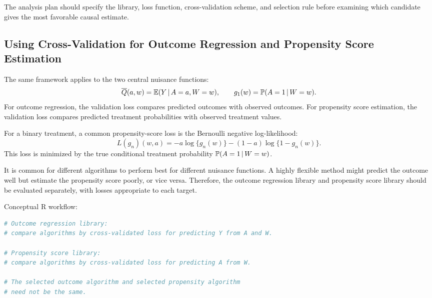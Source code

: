 \begin{keyidea}
The analysis plan should specify the library, loss function, cross-validation scheme,
and selection rule before examining which candidate gives the most favorable causal
estimate.
\end{keyidea}

\subsection{Using Cross-Validation for Outcome Regression and Propensity Score Estimation}

The same framework applies to the two central nuisance functions:
\[
\overline{Q}(a,w)=\mathbb{E}(Y\,\vert\, A=a,W=w),
\qquad
g_1(w)=\mathbb{P}(A=1\,\vert\, W=w).
\]
For outcome regression, the validation loss compares predicted outcomes with
observed outcomes. For propensity score estimation, the validation loss compares
predicted treatment probabilities with observed treatment values.

For a binary treatment, a common propensity-score loss is the Bernoulli negative
log-likelihood:
\[
L(g_n)(w,a)
=
-a\log\{g_n(w)\}-(1-a)\log\{1-g_n(w)\}.
\]
This loss is minimized by the true conditional treatment probability
$\mathbb{P}(A=1\,\vert\, W=w)$.

It is common for different algorithms to perform best for different nuisance
functions. A highly flexible method might predict the outcome well but estimate the
propensity score poorly, or vice versa. Therefore, the outcome regression library and
propensity score library should be evaluated separately, with losses appropriate to
each target.

\begin{implementationbox}
Conceptual R workflow:
\begin{lstlisting}[language=R]
# Outcome regression library:
# compare algorithms by cross-validated loss for predicting Y from A and W.

# Propensity score library:
# compare algorithms by cross-validated loss for predicting A from W.

# The selected outcome algorithm and selected propensity algorithm
# need not be the same.
\end{lstlisting}
\end{implementationbox}
